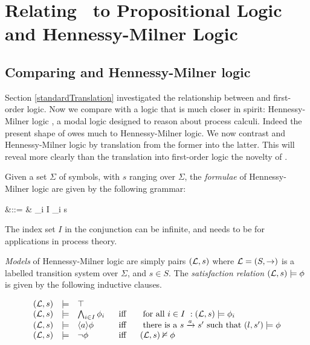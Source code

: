 
\section{Relating \cathoristic\ to Propositional Logic and Hennessy-Milner Logic}\label{relatingELToOtherLogics}

\subsection{Comparing \cathoristic{} and Hennessy-Milner logic}

Section \ref{standardTranslation} investigated the relationship
between \cathoristic{} and first-order logic. Now we compare \cathoristic{} with a
logic that is much closer in spirit: Hennessy-Milner logic
\cite{HennessyM:alglawfndac}, a modal logic designed to reason about
process calculi. Indeed the present shape of \cathoristic{} owes much to
Hennessy-Milner logic. We now contrast \cathoristic{} and Hennessy-Milner
logic by translation from the former into the latter.  This will
reveal more clearly than the translation into first-order logic the
novelty of \cathoristic{}.

Given a set $\Sigma$ of symbols, with $s$ ranging over
$\Sigma$, the \emph{formulae} of Hennessy-Milner logic are given
by the following grammar:
\begin{GRAMMAR}
  \phi 
     &\quad ::= \quad & 
  \top \fOr \BIGAND_{i \in I} \phi_i  \fOr \langle s \rangle \phi \fOr \neg \phi 
\end{GRAMMAR}

\NI The index set $I$ in the conjunction can be infinite, and needs to
be for applications in process theory.

 \emph{Models} of Hennessy-Milner logic are simply pairs $(\mathcal{L}, s)$
 where $\mathcal{L} = (S, \rightarrow)$ is a labelled transition system over
 $\Sigma$, and $s \in S$.  The \emph{satisfaction relation} $(\mathcal{L}, s)
 \models \phi$ is given by the following inductive clauses.

\[
\begin{array}{lclcl}
  (\mathcal{L}, s) 
     & \models & 
  \top  \\
  (\mathcal{L}, s) 
     & \models & 
  \bigwedge_{i \in I} \phi_i  &\  \mbox{ iff }\  & \mbox { for all $i \in I$ }: (\mathcal{L}, s) \models \phi_i  \\
  (\mathcal{L}, s) 
     & \models & 
  \langle a \rangle \phi & \mbox{ iff } & \mbox{ there is a } s \xrightarrow{a} s' \mbox { such that } (l,s') \models \phi  \\
  (\mathcal{L}, s) 
     & \models & 
  \neg \phi & \mbox{ iff } & (\mathcal{L}, s)  \nvDash \phi 
\end{array}
\]

